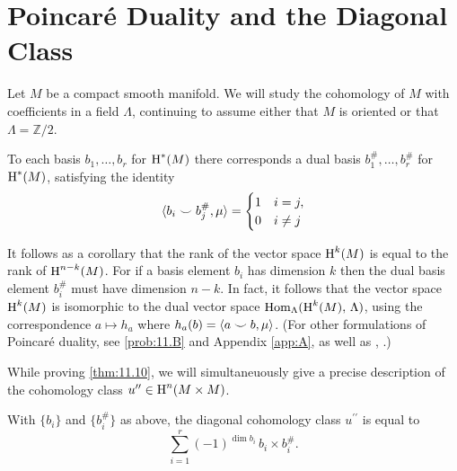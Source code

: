 \documentclass[../main]{subfiles}
\begin{document}
\section{Poincaré Duality and the Diagonal Class}


Let $M$ be a compact smooth manifold. We will study the cohomology of $M$ with coefficients in a field $\Lambda$, continuing to assume either that $M$ is oriented or that $\Lambda=\mathbb{Z} / 2$. 

\begin{theorem}
\label{thm:11.10}
To each basis $b_1, \dots, b_r$ for $\operatorname{H}^\ast(M)$ there corresponds a dual basis $b_1^\#, \dots, b_r^\#$ for $\operatorname{H}^\ast(M)$, satisfying the identity
\[
\langle b_i\smile b_j^\#,\mu\rangle =\begin{cases} 1 & i=j,\\0 &i\neq j\end{cases}
\]
\end{theorem}

It follows as a corollary that the rank of the vector space $\operatorname{H}^k(M)$ is equal to the rank of $\operatorname{H}^{n-k}(M)$. For if a basis element $b_i$ has dimension $k$ then the dual basis element $b_i^\#$ must have dimension $n-k$. In fact, it follows that the vector space $\operatorname{H}^k(M)$ is isomorphic to the dual vector space $\operatorname{Hom}_\Lambda(\operatorname{H}^k(M),\,\Lambda)$, using the correspondence $a\mapsto h_a$ where $h_a(b) = \langle a\smile b,\mu\rangle$. (For other formulations of Poincaré duality, see \ref{prob:11.B} and Appendix \ref{app:A}, as well as \cite{spanier1981}, \cite{dold1972}.)

While proving \ref{thm:11.10}, we will simultaneuously give a precise description of the cohomology class $u^{\prime\prime}\in\operatorname{H}^n(M\times M)$. 

\begin{theorem}
\label{thm:11.11}
With $\{b_i\}$ and $\{b_i^\#\}$ as above, the diagonal cohomology class $u^{\prime\prime}$ is equal to
\[
\sum^r_{i=1} (-1)^{\dim{b_i}} \, b_i\times b_i^\#.
\]
\end{theorem}
\end{document}
